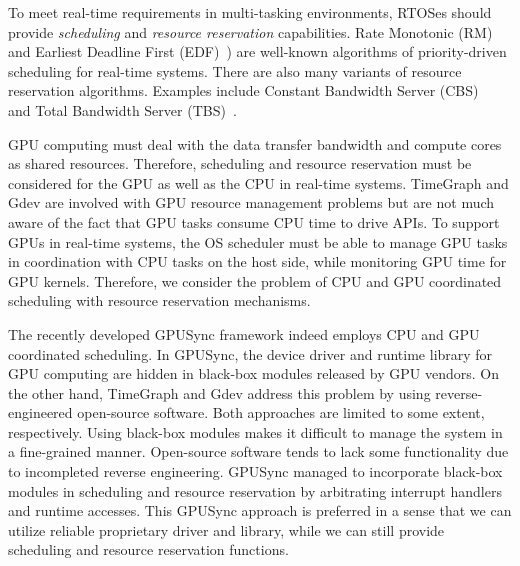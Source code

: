 To meet real-time requirements in multi-tasking environments, RTOSes
should provide \textit{scheduling} and \textit{resource reservation}
capabilities.
Rate Monotonic (RM) and Earliest Deadline First (EDF)~\cite{sched:ll})
are well-known algorithms of priority-driven scheduling for real-time
systems.
There are also many variants of resource reservation algorithms.
Examples include Constant Bandwidth Server (CBS)~\cite{rr:cbs} and Total
Bandwidth Server (TBS)~\cite{rr:tbs2}.

GPU computing must deal with the data transfer bandwidth and compute
cores as shared resources.
Therefore, scheduling and resource reservation must be considered for
the GPU as well as the CPU in real-time systems.
TimeGraph and Gdev are involved with GPU resource management problems
but are not much aware of the fact that GPU tasks consume CPU time to
drive APIs.
To support GPUs in real-time systems, the OS scheduler must be able to
manage GPU tasks in coordination with CPU tasks on the host side, while
monitoring GPU time for GPU kernels.
Therefore, we consider the problem of CPU and GPU coordinated scheduling
with resource reservation mechanisms.

The recently developed GPUSync framework indeed employs CPU and GPU
coordinated scheduling.
In GPUSync, the device driver and runtime library for GPU computing are
hidden in black-box modules released by GPU vendors.
On the other hand, TimeGraph and Gdev address this problem by using
reverse-engineered open-source software.
Both approaches are limited to some extent, respectively.
Using black-box modules makes it difficult to manage the system in a
fine-grained manner.
Open-source software tends to lack some functionality due to incompleted
reverse engineering.
GPUSync managed to incorporate black-box modules in scheduling and
resource reservation by arbitrating interrupt handlers and runtime
accesses.
This GPUSync approach is preferred in a sense that we can utilize
reliable proprietary driver and library, while we can still provide
scheduling and resource reservation functions.

